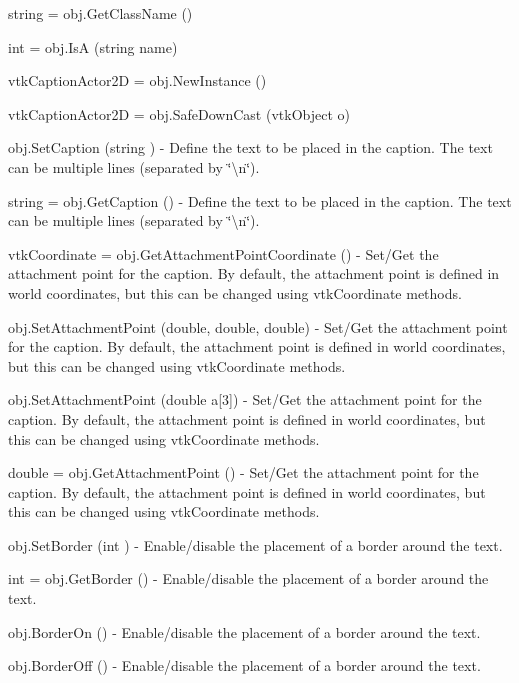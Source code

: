 \begin{DoxyItemize}
\item {\ttfamily string = obj.\-Get\-Class\-Name ()}  
\item {\ttfamily int = obj.\-Is\-A (string name)}  
\item {\ttfamily vtk\-Caption\-Actor2\-D = obj.\-New\-Instance ()}  
\item {\ttfamily vtk\-Caption\-Actor2\-D = obj.\-Safe\-Down\-Cast (vtk\-Object o)}  
\item {\ttfamily obj.\-Set\-Caption (string )} -\/ Define the text to be placed in the caption. The text can be multiple lines (separated by \char`\"{}\textbackslash{}n\char`\"{}).  
\item {\ttfamily string = obj.\-Get\-Caption ()} -\/ Define the text to be placed in the caption. The text can be multiple lines (separated by \char`\"{}\textbackslash{}n\char`\"{}).  
\item {\ttfamily vtk\-Coordinate = obj.\-Get\-Attachment\-Point\-Coordinate ()} -\/ Set/\-Get the attachment point for the caption. By default, the attachment point is defined in world coordinates, but this can be changed using vtk\-Coordinate methods.  
\item {\ttfamily obj.\-Set\-Attachment\-Point (double, double, double)} -\/ Set/\-Get the attachment point for the caption. By default, the attachment point is defined in world coordinates, but this can be changed using vtk\-Coordinate methods.  
\item {\ttfamily obj.\-Set\-Attachment\-Point (double a\mbox{[}3\mbox{]})} -\/ Set/\-Get the attachment point for the caption. By default, the attachment point is defined in world coordinates, but this can be changed using vtk\-Coordinate methods.  
\item {\ttfamily double = obj.\-Get\-Attachment\-Point ()} -\/ Set/\-Get the attachment point for the caption. By default, the attachment point is defined in world coordinates, but this can be changed using vtk\-Coordinate methods.  
\item {\ttfamily obj.\-Set\-Border (int )} -\/ Enable/disable the placement of a border around the text.  
\item {\ttfamily int = obj.\-Get\-Border ()} -\/ Enable/disable the placement of a border around the text.  
\item {\ttfamily obj.\-Border\-On ()} -\/ Enable/disable the placement of a border around the text.  
\item {\ttfamily obj.\-Border\-Off ()} -\/ Enable/disable the placement of a border around the text.  

\end{DoxyItemize}
